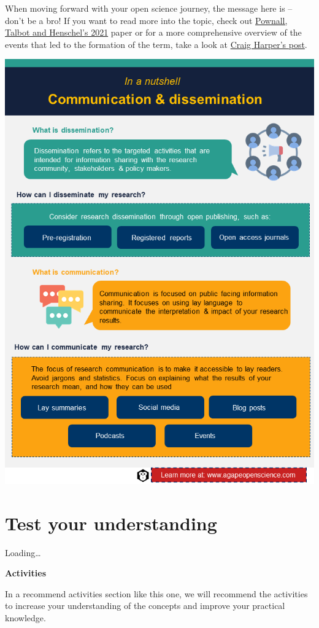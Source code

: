 \documentclass[
]{book}
\begin{document}
When moving forward with your open science journey, the message here is -- don't be a bro! If you want to read more into the topic, check out \href{https://journals.sagepub.com/doi/full/10.1177/03616843211029255}{Pownall, Talbot and Henschel's 2021} paper or for a more comprehensive overview of the events that led to the formation of the term, take a look at \href{https://craigharper.substack.com/p/bropen-science?s=r}{Craig Harper's post}.

\begin{center}\includegraphics[width=0.7\linewidth]{images/slide9} \end{center}

\hypertarget{test-your-understanding-7}{%
\section{Test your understanding}\label{test-your-understanding-7}}

Loading\ldots{}

\textbf{Activities}

In a recommend activities section like this one, we will recommend the activities to increase your understanding of the concepts and improve your practical knowledge.
\end{document}
